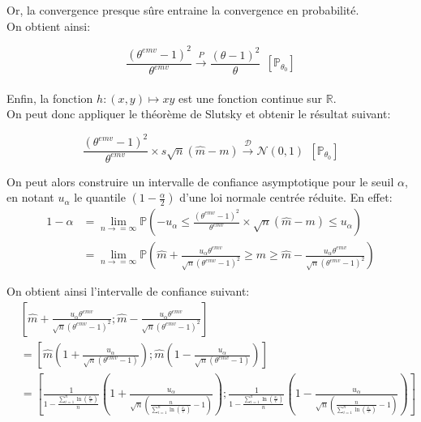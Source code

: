 \documentclass[a4paper,11pt]{article}
\theoremstyle{remark}
\begin{document}
Or, la convergence presque s\^ure entraine la convergence en probabilit\'e.\\

On obtient ainsi:

$$\frac{(\theta^{emv}-1)^{2}}{\theta^{emv}} \stackrel{P}{\longrightarrow}  \frac{(\theta-1)^{2}}{\theta}\ \  [\mathbb{P}_{\theta_{0}}] $$
\\

Enfin, la fonction $h:(x,y)\longmapsto xy$ est une fonction continue sur $\mathbb{R}$.\\


On peut donc appliquer le th\' eor\`eme de Slutsky et obtenir le r\'esultat suivant:

$$\frac{(\theta^{emv}-1)^{2}}{\theta^{emv}}\times s\sqrt{n}(\hat{m}-m)\stackrel{\mathcal{D}}{\longrightarrow}\mathcal{N}(0,1) \ \  [\mathbb{P}_{\theta_{0}}]$$

On peut alors construire un intervalle de confiance asymptotique pour le seuil $\alpha$, en notant $u_{\alpha} $ le quantile $(1-\frac{\alpha}{2})$ d'une loi normale centr\'ee r\'eduite. En effet:
\begin{align*}
1-\alpha &= \lim_{n\rightarrow =\infty}\mathbb{P}(-u_{\alpha}\leq\frac{(\theta^{emv}-1)^{2}}{\theta^{emv}}\times\sqrt{n}(\hat{m}-m)\leq u_{\alpha})\\
		&= \lim_{n\rightarrow =\infty}\mathbb{P}(\hat{m}+\frac{u_{\alpha}\theta^{emv}}{\sqrt{n}(\theta^{emv}-1)^{2}}\geq m \geq \hat{m}-\frac{u_{\alpha}\theta^{emv}}{\sqrt{n}(\theta^{emv}-1)^{2}})
\end{align*}

On obtient ainsi l'intervalle de confiance suivant:
\begin{align*}
&[\hat{m}+\frac{u_{\alpha}\theta^{emv}}{\sqrt{n}(\theta^{emv}-1)^{2}}; \hat{m}-\frac{u_{\alpha}\theta^{emv}}{\sqrt{n}(\theta^{emv}-1)^{2}}]
\\&=[\hat{m}(1+\frac{u_{\alpha}}{\sqrt{n}(\theta^{emv}-1)}); \hat{m}(1-\frac{u_{\alpha}}{\sqrt{n}(\theta^{emv}-1)})]\\
		&=[\frac{1}{1-\frac{\sum_{i=1}^{n}\ln(\frac{x_{i}}{c})}{n}}(1+\frac{u_{\alpha}}{\sqrt{n}(\frac{n}{\sum_{i=1}^{n}\ln(\frac{x_{i}}{c})}-1)}); \frac{1}{1-\frac{\sum_{i=1}^{n}\ln(\frac{x_{i}}{c})}{n}}(1-\frac{u_{\alpha}}{\sqrt{n}(\frac{n}{\sum_{i=1}^{n}\ln(\frac{x_{i}}{c})}-1)})]		
\end{align*}



\end{document}
